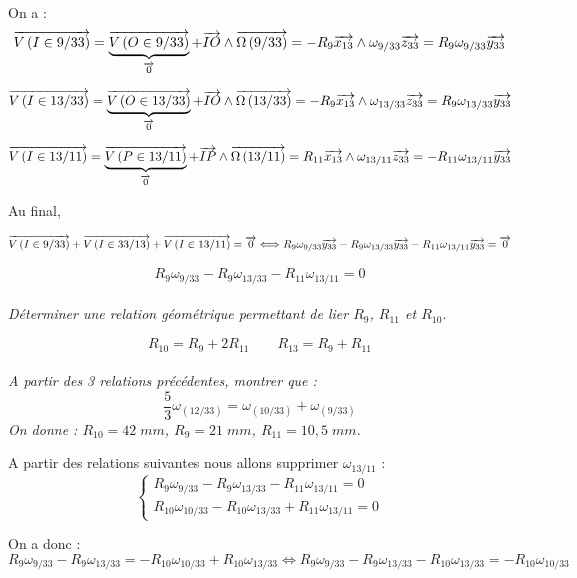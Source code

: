 \documentclass[11pt,oneside]{article}
\begin{document}
On a :
$$
\overrightarrow{V\left( {I} \in {9}/{33}\right)} 
= \underbrace{\overrightarrow{V\left( {O} \in {9}/{33}\right)}}_{\overrightarrow{0}} + \overrightarrow{IO}\wedge \overrightarrow{\Omega\left( {9}/{33}\right)} 
= -R_9 \overrightarrow{x_{13}}\wedge \omega_{9/33}\overrightarrow{z_{33}}
=R_9 \omega_{9/33}\overrightarrow{y_{33}}
$$

$$
\overrightarrow{V\left( {I} \in {13}/{33}\right)} 
= \underbrace{\overrightarrow{V\left( {O} \in {13}/{33}\right)}}_{\overrightarrow{0}} + \overrightarrow{IO}\wedge \overrightarrow{\Omega\left( {13}/{33}\right)} 
= -R_9 \overrightarrow{x_{13}}\wedge \omega_{13/33}\overrightarrow{z_{33}}
=R_9 \omega_{13/33}\overrightarrow{y_{33}}
$$

$$
\overrightarrow{V\left( {I} \in {13}/{11}\right)} 
= \underbrace{\overrightarrow{V\left( {P} \in {13}/{11}\right)}}_{\overrightarrow{0}} + \overrightarrow{IP}\wedge \overrightarrow{\Omega\left( {13}/{11}\right)} 
= R_{11} \overrightarrow{x_{13}}\wedge \omega_{13/11}\overrightarrow{z_{33}}
=-R_{11} \omega_{13/11}\overrightarrow{y_{33}}
$$

Au final, 

$$
\overrightarrow{V\left( {I} \in {9}/{33}\right)}+\overrightarrow{V\left( {I} \in {33}/{13}\right)}+\overrightarrow{V\left( {I} \in {13}/{11}\right)} = \overrightarrow{0} 
\Longleftrightarrow
R_9 \omega_{9/33}\overrightarrow{y_{33}}-R_9 \omega_{13/33}\overrightarrow{y_{33}}-R_{11} \omega_{13/11}\overrightarrow{y_{33}} = \overrightarrow{0} 
$$

$$
R_9 \omega_{9/33}-R_9 \omega_{13/33}-R_{11} \omega_{13/11}=0
$$







\paragraph{}
\textit{Déterminer une relation géométrique permettant de lier $R_{9}$, $R_{11}$ et $R_{10}$.}

$$
R_{10}=R_9+2R_{11} \quad \quad R_{13}=R_9 + R_{11}
$$


\paragraph{}
\textit{A partir des 3 relations précédentes, montrer que : 
$$
\dfrac{5}{3}\omega_{(12/33)} = \omega_{(10/33)}+\omega_{(9/33)}
$$
On donne : $R_{10}=42\;mm$, $R_{9}=21\;mm$, $R_{11}=10,5 \;mm$.}

A partir des relations suivantes nous allons supprimer $\omega_{13/11}$ :
$$
\left\{
\begin{array}{l}
R_9 \omega_{9/33}-R_9 \omega_{13/33}-R_{11} \omega_{13/11}=0 \\
R_{10} \omega_{10/33}- R_{10} \omega_{13/33} +R_{11} \omega_{13/11}=0
\end{array}
\right.
$$

On a donc : 
$$
R_9 \omega_{9/33}-R_9 \omega_{13/33} = -R_{10} \omega_{10/33}+R_{10} \omega_{13/33}
\Longleftrightarrow
R_9 \omega_{9/33}-R_9 \omega_{13/33} -R_{10} \omega_{13/33}= -R_{10} \omega_{10/33}
$$
\end{document}
